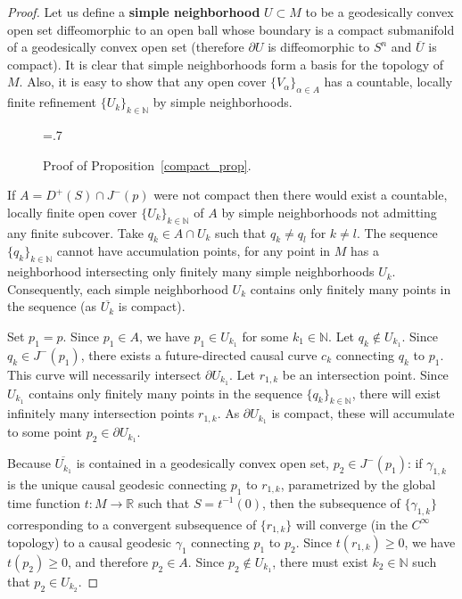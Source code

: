 \documentclass[10pt]{amsart}
\newcommand{\bbR}{\mathbb{R}}      %
\newcommand{\bbN}{\mathbb{N}}      %
\theoremstyle{definition}
\theoremstyle{remark}
\begin{document}
\begin{proof}
Let us define a {\bf simple neighborhood} $U \subset M$ to be a geodesically convex open set diffeomorphic to an open ball whose boundary is a compact submanifold of a geodesically convex open set (therefore $\partial U$ is diffeomorphic to $S^n$ and $\overline{U}$ is compact). It is clear that simple neighborhoods form a basis for the topology of $M$. Also, it is easy to show that any open cover $\{ V_\alpha \}_{\alpha \in A}$ has a countable, locally finite refinement $\{ U_k \}_{k \in \bbN}$ by simple neighborhoods.

\begin{figure}[h!]
\begin{center}
\epsfxsize=.7\textwidth
\leavevmode
{}
\end{center}
\caption{Proof of Proposition~\ref{compact_prop}.} \label{Figure_comp}
\end{figure}

If $A=D^+(S)\cap J^-(p)$ were not compact then there would exist a countable, locally finite open cover $\{ U_k \}_{k \in \bbN}$ of $A$ by simple neighborhoods not admitting any finite subcover. Take $q_k \in A \cap U_k$ such that $q_k \neq q_l$ for $k \neq l$. The sequence $\{ q_k \}_{k \in \bbN}$ cannot have accumulation points, for any point in $M$ has a neighborhood intersecting only finitely many simple neighborhoods $U_k$. Consequently, each simple neighborhood $U_k$ contains only finitely many points in the sequence (as $\overline{U_k}$ is compact).

Set $p_1=p$. Since $p_1 \in A$, we have $p_1 \in U_{k_1}$ for some $k_1 \in \bbN$. Let $q_k \not\in U_{k_1}$. Since $q_k \in J^-(p_1)$, there exists a future-directed causal curve $c_k$ connecting $q_k$ to $p_1$. This curve will necessarily intersect $\partial U_{k_1}$. Let $r_{1,k}$ be an intersection point. Since $U_{k_1}$ contains only finitely many points in the sequence $\{ q_k \}_{k \in \bbN}$, there will exist infinitely many intersection points $r_{1,k}$. As $\partial U_{k_1}$ is compact, these will accumulate to some point $p_2 \in \partial U_{k_1}$.

Because $\overline{U_{k_1}}$ is contained in a geodesically convex open set, $p_2 \in J^-(p_1)$: if $\gamma_{1,k}$ is the unique causal geodesic connecting $p_1$ to $r_{1,k}$, parametrized by the global time function $t:M \to \bbR$ such that $S=t^{-1}(0)$, then the subsequence of $\{\gamma_{1,k}\}$ corresponding to a convergent subsequence of $\{r_{1,k}\}$ will converge (in the $C^\infty$ topology) to a causal geodesic $\gamma_1$ connecting $p_1$ to $p_2$. Since $t(r_{1,k}) \geq 0$, we have $t(p_2) \geq 0$, and therefore $p_2 \in A$. Since $p_2 \not\in U_{k_1}$, there must exist $k_2 \in \bbN$ such that $p_2 \in U_{k_2}$. 


\end{proof}
\end{document}

